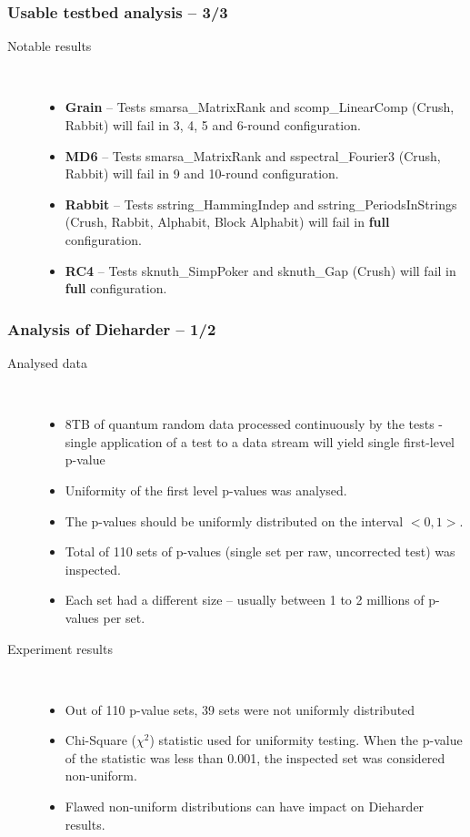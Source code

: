\documentclass[aspectratio=169]{beamer}
\begin{document}
\begin{frame}
\frametitle{Usable testbed analysis -- 3/3}

\begin{description}
\item[Notable results] \hfill \\
\begin{itemize}
\item \textbf{Grain} -- Tests smarsa\_MatrixRank and scomp\_LinearComp (Crush, Rabbit) will fail in 3, 4, 5 and 6-round configuration.
\item \textbf{MD6} -- Tests smarsa\_MatrixRank and sspectral\_Fourier3 (Crush, Rabbit) will fail in 9 and 10-round configuration.
\item \textbf{Rabbit} -- Tests sstring\_HammingIndep and sstring\_PeriodsInStrings (Crush, Rabbit, Alphabit, Block Alphabit) will fail in \textbf{full} configuration.
\item \textbf{RC4} -- Tests sknuth\_SimpPoker and sknuth\_Gap (Crush) will fail in \textbf{full} configuration.
\end{itemize}
\end{description}

\end{frame}

\begin{frame}
\frametitle{Analysis of Dieharder -- 1/2}

\begin{description}
\item[Analysed data] \hfill \\
\begin{itemize}
\item 8TB of quantum random data processed continuously by the tests - single application of a test to a data stream will yield single first-level p-value
\item Uniformity of the first level p-values was analysed.
\item The p-values should be uniformly distributed on the interval $<0,1>$.
\item Total of 110 sets of p-values (single set per raw, uncorrected test) was inspected.
\item Each set had a different size -- usually between 1 to 2 millions of p-values per set.
\end{itemize}
\vspace{.2cm}
\item[Experiment results] \hfill \\
\begin{itemize}
\item Out of 110 p-value sets, 39 sets were not uniformly distributed
\item Chi-Square ($\chi^2$) statistic used for uniformity testing. When the p-value of the statistic was less than 0.001, the inspected set was considered non-uniform.
\item Flawed non-uniform distributions can have impact on Dieharder results.
\end{itemize}
\end{description}

\end{frame}
\end{document}
